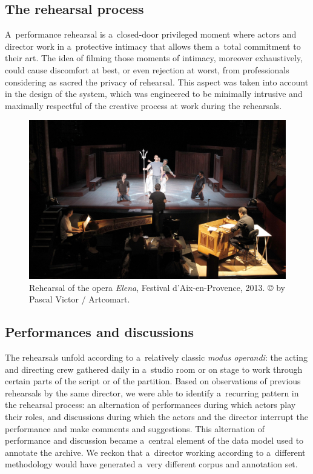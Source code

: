 \documentclass[conference]{IEEEtran}
\begin{document}
\subsection{The rehearsal process}

A~performance rehearsal is a~closed-door privileged moment where actors and director work in a~protective intimacy that allows them a~total commitment to their art. The idea of filming those moments of intimacy, moreover exhaustively, could cause discomfort at best, or even rejection at worst, from professionals considering as sacred the privacy of rehearsal. This aspect was taken into account in the design of the system, 
which was engineered to be minimally intrusive and maximally respectful of  the creative process at work
during the rehearsals.

\begin{figure}[htb!]
  \centering
  \includegraphics[width=\columnwidth]{elena}
  \caption{Rehearsal of the opera \emph{Elena}, Festival d’Aix-en-Provence, 2013. © by Pascal Victor / Artcomart.}
  \label{fig:elena}
\end{figure}


\subsection{Performances and discussions}

The rehearsals unfold according to a~relatively classic \emph{modus operandi}: the acting and directing crew gathered daily in a~studio room or on stage to work through certain parts of the script or of the partition. Based on observations of previous rehearsals by the same director, we were able to identify a~recurring pattern in the rehearsal process: an alternation of performances during which actors play their roles, and discussions during which the actors and the director interrupt the performance and make comments and suggestions. This alternation of performance and discussion became a~central element of the data model used to annotate the archive. We reckon that a~director working according to a~different methodology would have generated a~very different corpus and annotation set.
\end{document}
